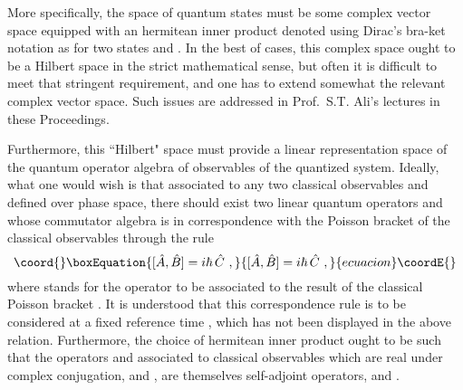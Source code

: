 \documentclass[a4paper,11pt]{article}
\begin{document}
More specifically, the space of quantum states must be some complex
vector space equipped with an hermitean inner product denoted using
Dirac's bra-ket notation as \myHighlight{$<\varphi|\psi>$}\coordHE{} for two states
\myHighlight{$|\varphi>$}\coordHE{} and \myHighlight{$|\psi>$}\coordHE{}. In the best of cases, this complex space
ought to be a Hilbert space in the strict mathematical sense, but
often it is difficult to meet that stringent requirement, and one
has to extend somewhat the relevant complex vector space. Such issues
are addressed in Prof.~S.T. Ali's lectures in these Proceedings.

Furthermore, this ``Hilbert" space must provide a linear representation
space of the quantum operator algebra of observables of the quantized
system. Ideally, what one would wish is that associated to any two
classical observables \coordHE{} and \coordHE{} defined over phase space, there should
exist two linear quantum operators \coordHE{} and \coordHE{} whose
commutator algebra is in correspondence with the Poisson bracket of the
classical observables through the rule
\begin{equation}\coord{}\boxEquation{
[\hat{A},\hat{B}]=i\hbar\,\hat{C}\ ,
}{
[\hat{A},\hat{B}]=i\hbar\,\hat{C}\ ,
}{ecuacion}\coordE{}\end{equation}
where \coordHE{} stands for the operator to be associated to
the result of the classical Poisson bracket \coordHE{}.
It is understood that this correspondence rule is to be considered at
a fixed reference time \coordHE{}, which has not been displayed in the
above relation. Furthermore, the choice of hermitean inner product
ought to be such that the operators \coordHE{} and \coordHE{} associated
to classical observables which are real under complex conjugation,
\coordHE{} and \coordHE{}, are themselves self-adjoint operators,
\coordHE{} and \coordHE{}.
\end{document}
